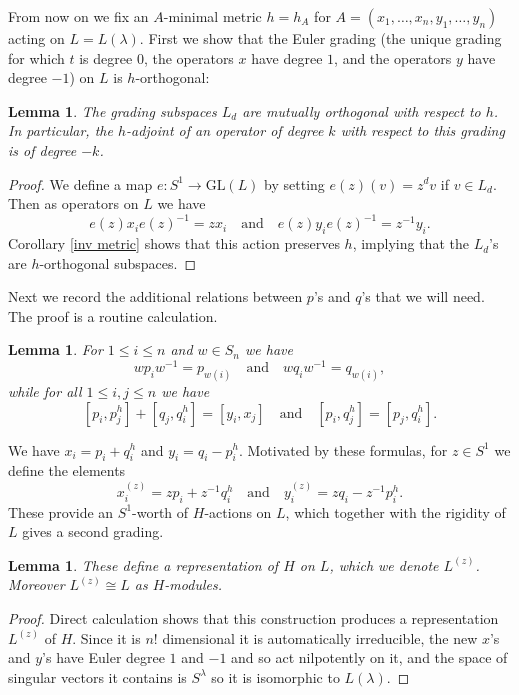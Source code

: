 \documentclass[12pt, reqno]{amsart}
\numberwithin{equation}{section}
\theoremstyle{definition}
\theoremstyle{plain}
\newtheorem{lemma}[theorem]{Lemma}
\begin{document}
From now on we fix an $A$-minimal metric $h=h_A$ for $A=(x_1,\dots,x_n,y_1,\dots,y_n)$ acting on $L=L(\lambda)$. First we show that the Euler grading (the unique grading for which $t$ is degree $0$, the operators $x$ have degree $1$, and the operators $y$ have degree $-1$) on $L$ is $h$-orthogonal:
\begin{lemma}
The grading subspaces $L_d$ are mutually orthogonal with respect to $h$. In particular, the $h$-adjoint of an operator of degree $k$ with respect to this grading is of degree $-k$.
\end{lemma}
\begin{proof}
We define a map $e:S^1 \to \mathrm{GL}(L)$ by setting $e(z)(v)=z^d v$ if $v \in L_d$. Then as operators on $L$ we have
$$e(z) x_i e(z)^{-1}=zx_i \quad \text{and} \quad e(z) y_i e(z)^{-1}=z^{-1} y_i.$$ Corollary \ref{inv metric} shows that this action preserves $h$, implying that the $L_d$'s are $h$-orthogonal subspaces. \end{proof}

Next we record the additional relations between $p$'s and $q$'s that we will need. The proof is a routine calculation.
\begin{lemma} \label{ps and qs}
For $1 \leq i \leq n$ and $w \in S_n$ we have
$$w p_i w^{-1}=p_{w(i)} \quad \text{and} \quad w q_i w^{-1}=q_{w(i)},$$
while for all $1 \leq i,j \leq n$ we have
$$[p_i,p_j^h]+[q_j,q_i^h]=[y_i,x_j] \quad \text{and} \quad  [p_i,q_j^h]=[p_j,q_i^h].$$ \end{lemma}


We have $x_i=p_i+q_i^h$ and $y_i=q_i-p_i^h$. Motivated by these formulas, for $z \in S^1$ we define the elements
$$x_i^{(z)}=zp_i+z^{-1} q_i^h \quad \text{and} \quad y_i^{(z)}=zq_i-z^{-1} p_i^h.$$ These provide an $S^1$-worth of $H$-actions on $L$, which together with the rigidity of $L$ gives a second grading.

\begin{lemma}
These define a representation of $H$ on $L$, which we denote $L^{(z)}$. Moreover $L^{(z)} \cong L$ as $H$-modules.
\end{lemma}
\begin{proof}
Direct calculation shows that this construction produces a representation $L^{(z)}$ of $H$. Since it is $n!$ dimensional it is automatically irreducible, the new $x$'s and $y$'s have Euler degree $1$ and $-1$ and so act nilpotently on it, and the space of singular vectors it contains is $S^\lambda$ so it is isomorphic to $L(\lambda)$.
\end{proof}
\end{document}
